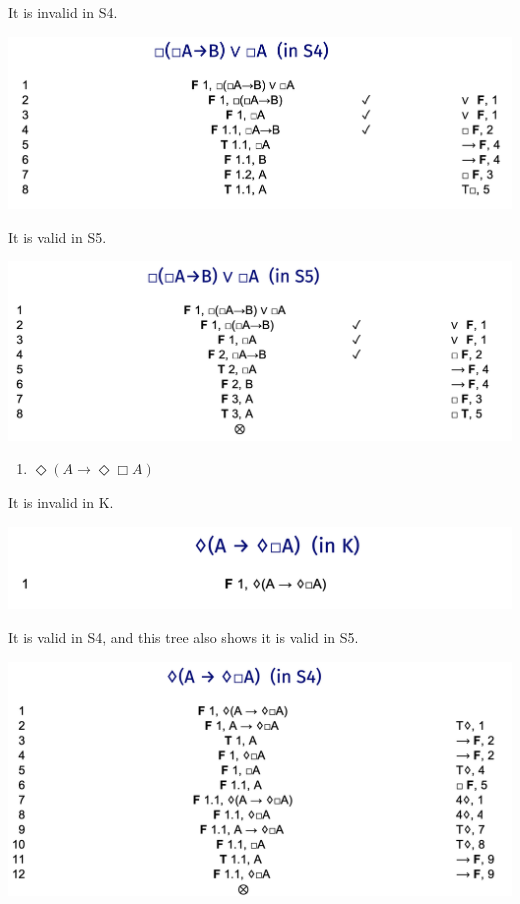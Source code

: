 \documentclass[
  11pt,
]{article}
\providecommand{\tightlist}{%
  \setlength{\itemsep}{0pt}\setlength{\parskip}{0pt}}
\begin{document}
It is invalid in S4.

\includegraphics{q15b.png}

It is valid in S5.

\includegraphics{q15c.png}

\begin{enumerate}
\def\labelenumi{\arabic{enumi}.}
\setcounter{enumi}{15}
\tightlist
\item
  \(\Diamond(A \rightarrow \Diamond \Box A)\)
\end{enumerate}

It is invalid in K.

\includegraphics{q16a.png}

It is valid in S4, and this tree also shows it is valid in S5.

\includegraphics{q16b.png}
\end{document}
